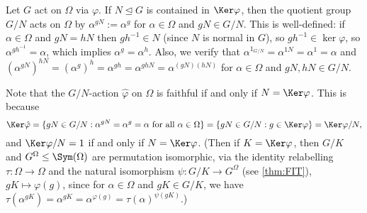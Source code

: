 \begin{example}\label{eg:quotient_action}
    Let $G$ act on $\Omega$ via $\varphi$. If $N \unlhd G$ is contained in $\Ker\varphi$, then the quotient group $G/N$ acts on $\Omega$ by $\alpha^{gN} := \alpha^g$ for $\alpha \in \Omega$ and $gN \in G/N$. This is well-defined: if $\alpha \in \Omega$ and $gN = hN$ then $gh^{-1} \in N$ (since $N$ is normal in $G$), so $gh^{-1} \in \ker\varphi$, so $\alpha^{gh^{-1}} = \alpha$, which implies $\alpha^g = \alpha^h$. Also, we verify that $\alpha^{1_{G/N}} = \alpha^{1N} = \alpha^1 = \alpha$ and $(\alpha^{gN})^{hN} = (\alpha^g)^h = \alpha^{gh} = \alpha^{ghN} = \alpha^{(gN)(hN)}$ for $\alpha \in \Omega$ and $gN,hN \in G/N$.

    Note that the $G/N$-action $\hat\varphi$ on $\Omega$ is faithful if and only if $N = \Ker\varphi$. This is because
    $$\Ker\hat\varphi = \{gN \in G/N : \alpha^{gN} = \alpha^g = \alpha\ \text{for all}\ \alpha \in \Omega\} = \{gN \in G/N : g \in \Ker\varphi\} = \Ker\varphi/N,$$
    and $\Ker\varphi/N = 1$ if and only if $N = \Ker\varphi$. (Then if $K = \Ker\varphi$, then $G/K$ and $G^\Omega \leq \Sym(\Omega)$ are permutation isomorphic, via the identity relabelling $\tau : \Omega \to \Omega$ and the natural isomorphism $\psi : G/K \to G^\Omega$ (see \autoref{thm:FIT}), $gK \mapsto \varphi(g)$, since for $\alpha \in \Omega$ and $gK \in G/K$, we have $\tau(\alpha^{gK}) = \alpha^{gK} = \alpha^{\varphi(g)} = \tau(\alpha)^{\psi(gK)}$.)
\end{example}


